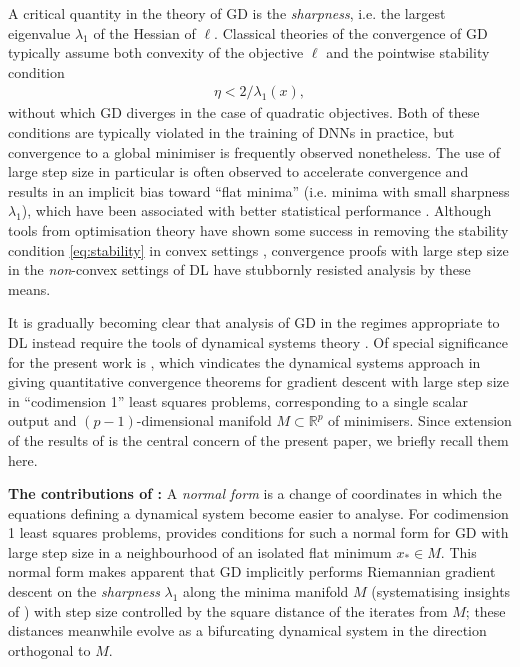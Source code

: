 \documentclass{article}
\newcommand{\RB}{\mathbb{R}}
\theoremstyle{plain}
\theoremstyle{definition}
\theoremstyle{remark}
\begin{document}
A critical quantity in the theory of GD is the \emph{sharpness}, i.e. the largest eigenvalue $\lambda_1$ of the Hessian of $\ell$. Classical theories of the convergence of GD typically assume both convexity of the objective $\ell$ and the pointwise stability condition
\begin{align}\label{eq:stability}
\eta < 2/\lambda_1(x),
\end{align}
without which GD diverges in the case of quadratic objectives. Both of these conditions are typically violated in the training of DNNs in practice, but convergence to a global minimiser is frequently observed nonetheless. The use of large step size in particular is often observed to accelerate convergence \cite{coheneos} and results in an implicit bias toward ``flat minima'' (i.e. minima with small sharpness $\lambda_1$), which have been associated with better statistical performance \cite{keskar}. Although tools from optimisation theory have shown some success in removing the stability condition \eqref{eq:stability} in convex settings \cite{grimmer1, grimmer2, grimmer3, altschuler1, altschuler2, wu2023eos, wu2024eos, wu2025eos}, convergence proofs with large step size in the \emph{non}-convex settings of DL have stubbornly resisted analysis by these means.

It is gradually becoming clear that analysis of GD in the regimes appropriate to DL instead require the tools of dynamical systems theory \cite{leegd, damianeos, macdonaldeos}. Of special significance for the present work is \cite{macdonaldeos}, which vindicates the dynamical systems approach in giving quantitative convergence theorems for gradient descent with large step size in ``codimension 1'' least squares problems, corresponding to a single scalar output and $(p-1)$-dimensional manifold $M\subset\RB^p$ of minimisers. Since extension of the results of \cite{macdonaldeos} is the central concern of the present paper, we briefly recall them here.

\textbf{The contributions of \cite{macdonaldeos}:} A \emph{normal form} is a change of coordinates in which the equations defining a dynamical system become easier to analyse. For codimension 1 least squares problems, \cite{macdonaldeos} provides conditions for such a normal form for GD with large step size in a neighbourhood of an isolated flat minimum $x_*\in M$. This normal form makes apparent that GD implicitly performs Riemannian gradient descent on the \emph{sharpness} $\lambda_1$ along the minima manifold $M$ (systematising insights of \cite{aroraeos, damianeos}) with step size controlled by the square distance of the iterates from $M$; these distances meanwhile evolve as a bifurcating dynamical system in the direction orthogonal to $M$.
\end{document}
